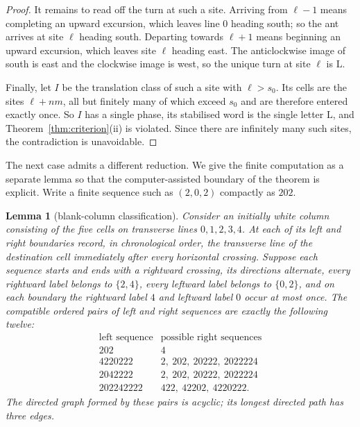 \documentclass[11pt,reqno]{amsart}
\theoremstyle{plain}
\newtheorem{lemma}[theorem]{Lemma}
\theoremstyle{definition}
\newcommand{\turnL}{\mathrm{L}}
\begin{document}
\begin{proof}
It remains to read off the turn at such a site. Arriving from $\ell-1$ means
completing an upward excursion, which leaves line $0$ heading south; so the ant
arrives at site $\ell$ heading south. Departing towards $\ell+1$ means beginning an
upward excursion, which leaves site $\ell$ heading east. The anticlockwise image of
south is east and the clockwise image is west, so the unique turn at site $\ell$ is
$\turnL$.

Finally, let $I$ be the translation class of such a site with $\ell>s_0$. Its cells
are the sites $\ell+nm$, all but finitely many of which exceed $s_0$ and are therefore
entered exactly once. So $I$ has a single phase, its stabilised word is the single
letter $\turnL$, and Theorem~\ref{thm:criterion}(ii) is violated. Since there are
infinitely many such sites, the contradiction is unavoidable.
\end{proof}

The next case admits a different reduction.  We give the finite computation as a
separate lemma so that the computer-assisted boundary of the theorem is explicit.
Write a finite sequence such as $(2,0,2)$ compactly as $202$.

\begin{lemma}[blank-column classification]\label{lem:blankcolumn}
Consider an initially white column consisting of the five cells on transverse
lines $0,1,2,3,4$.  At each of its left and right boundaries record, in chronological
order, the transverse line of the destination cell immediately after every horizontal
crossing.  Suppose each sequence starts and ends with a rightward crossing, its
directions alternate, every rightward label belongs to $\{2,4\}$, every leftward
label belongs to $\{0,2\}$, and on each boundary the rightward label $4$ and
leftward label $0$ occur at most once.  The compatible ordered pairs of left and
right sequences are exactly the following twelve:
\[
\begin{array}{c|l}
\text{left sequence}&\text{possible right sequences}\\ \hline
202&4\\
4220222&2,\ 202,\ 20222,\ 2022224\\
2042222&2,\ 202,\ 20222,\ 2022224\\
202242222&422,\ 42202,\ 4220222.
\end{array}
\]
The directed graph formed by these pairs is acyclic; its longest directed path has
three edges.
\end{lemma}
\end{document}
